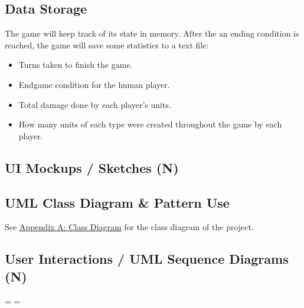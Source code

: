 \documentclass[11pt]{amsart}
\begin{document}
\subsection*{Data Storage} \phantom{}

The game will keep track of its state in memory. After the an ending condition is reached, the game will save some statistics to a text file:
\begin{itemize}
    \item Turns taken to finish the game.
    \item Endgame condition for the human player.
    \item Total damage done by each player's units.
    \item How many units of each type were created throughout the game by each player.
\end{itemize}

\subsection*{UI Mockups / Sketches (N)} \phantom{}
\subsection*{UML Class Diagram \& Pattern Use} \phantom{}

See \hyperref[sec:appendixa]{Appendix A: Class Diagram} for the class diagram of the project.

\subsection*{User Interactions / UML Sequence Diagrams (N)} \phantom{}


\newpage
\paperwidth=45in
\paperheight=8in
\pdfpagewidth=\paperwidth
\pdfpageheight=\paperheight





% 
\end{document}
